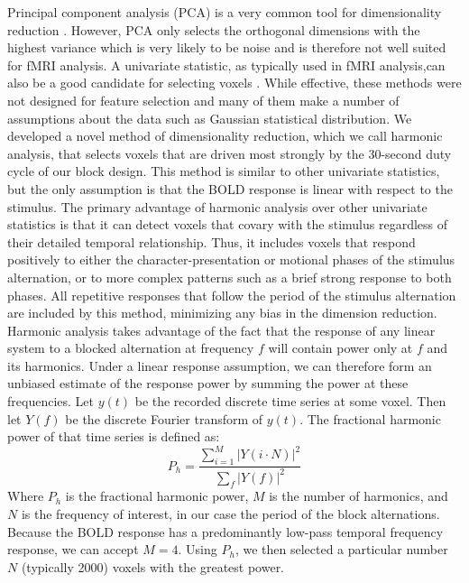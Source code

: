 \documentclass[preprint,5p,authoryear]{elsarticle}
\begin{document}
Principal component analysis (PCA) is a very common tool for dimensionality reduction \citep{Hotelling1933}.
However, PCA only selects the orthogonal dimensions with the highest variance which is very likely to be noise and is therefore not well suited for fMRI analysis.
A univariate statistic, as typically used in  fMRI analysis,can also be a good candidate for selecting voxels \citep{Norman2006,Pereira2009}.
While effective, these methods were not designed for feature selection and many of them make a number of assumptions about the data such as Gaussian statistical distribution.
We developed a novel method of dimensionality reduction, which we call harmonic analysis, that selects voxels that are driven most strongly by the 30-second duty cycle of our block design.
This method is similar to other univariate statistics, but the only assumption is that the BOLD response is linear with respect to the stimulus.
The primary advantage  of harmonic analysis over other univariate statistics is that it can detect voxels that covary with the stimulus regardless of their detailed temporal relationship. Thus, it includes voxels that respond positively to either the character-presentation or motional phases of the stimulus alternation, or to more complex patterns such as a brief strong response to both phases. All repetitive responses that follow the period of the stimulus alternation are included by this method, minimizing any bias in the dimension reduction.
Harmonic analysis takes advantage of the fact that the response of any linear system to a blocked alternation at frequency $f$ will contain power only at $f$ and its harmonics. 
Under a linear response assumption, we can therefore form an unbiased estimate of the response power by summing the power at these frequencies. 
Let $y(t)$ be the recorded discrete time series at some voxel.
Then let $Y(f)$ be the discrete Fourier transform of $y(t)$.
The fractional harmonic power of that time series is defined as:
\begin{equation}
P_h = \frac{\sum_{i = 1}^{M}{\left|Y(i \cdot N)\right|^{2}}}{\sum_{f}{\left|Y(f)\right|^{2}}}
\end{equation}
Where $P_h$ is the fractional harmonic power, $M$ is the number of harmonics, and $N$ is the frequency of interest, in our case the period of the block alternations. 
Because the BOLD response has a predominantly low-pass temporal frequency response, we can accept $M = 4$. 
Using $P_h$, we then selected a particular number $N$ (typically 2000) voxels with the greatest power. 
\end{document}
